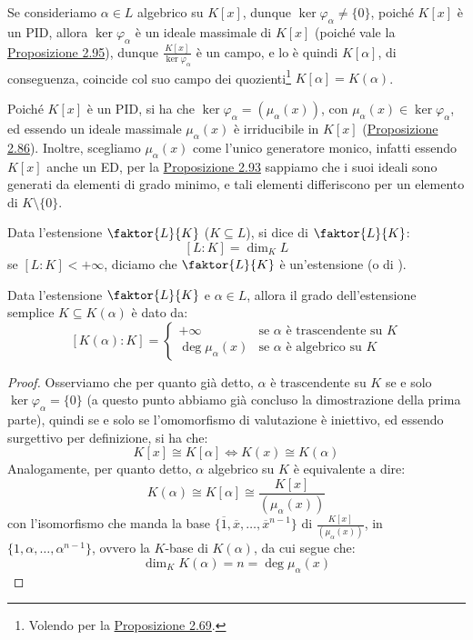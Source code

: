 \documentclass[11pt]{scrartcl}
\begin{document}
Se consideriamo $\alpha \in L$ algebrico su $K[x]$, dunque $\ker \varphi_{\alpha} \ne \{0\}$, poiché $K[x]$ è un PID, allora $\ker \varphi_{\alpha}$ è un ideale massimale di $K[x]$ (poiché 
vale la \hyperref[2.95]{Proposizione 2.95}), dunque $\displaystyle \frac{K[x]}{\ker \varphi_{\alpha}}$ è un campo, e lo è quindi $K[\alpha]$, di conseguenza, coincide col
suo campo dei quozienti\footnote{Volendo per la \hyperref[2.69]{Proposizione 2.69}.} $K[\alpha] = K(\alpha)$.

\begin{remark}
    Poiché $K[x]$ è un PID, si ha che $\ker \varphi_{\alpha} = (\mu_{\alpha}(x))$, con $\mu_\alpha(x) \in \ker \varphi_\alpha$, ed essendo un ideale massimale $\mu_\alpha(x)$ è irriducibile in $K[x]$ (\hyperref[2.86]{Proposizione 2.86}).
    Inoltre, scegliamo $\mu_\alpha(x)$ come l'unico generatore monico, infatti essendo $K[x]$ anche un ED, per la \hyperref[2.93]{Proposizione 2.93} sappiamo che i suoi ideali sono generati da elementi di grado minimo, e tali elementi differiscono per un elemento di $K \setminus\{0\}$.
\end{remark}

\begin{definition}
    Data l'estensione $\faktor{L}{K}$ ($K \subseteq L$), si dice  di $\faktor{L}{K}$:
    \[ [L:K] = \dim_K L
        \]
    se $[L:K] < +\infty$, diciamo che $\faktor{L}{K}$ è un'estensione  (o di ).
\end{definition}

\begin{proposition}
    \label{3.7}
    Data l'estensione $\faktor{L}{K}$ e $\alpha \in L$, allora il grado dell'estensione semplice $K \subseteq K(\alpha)$ è dato da:
    \[ [K(\alpha) : K] = \begin{cases}
        +\infty & \text{se $\alpha$ è trascendente su $K$}\\
        \deg \mu_\alpha(x) & \text{se $\alpha$ è algebrico su $K$}
    \end{cases}
        \]
\end{proposition}

\begin{proof}
    Osserviamo che per quanto già detto, $\alpha$ è trascendente su $K$ se e solo $\ker \varphi_\alpha = \{0\}$ (a questo punto abbiamo già concluso la dimostrazione della prima parte), quindi se e solo se l'omomorfismo di valutazione è iniettivo, ed essendo 
    surgettivo per definizione, si ha che:
    \[ K[x] \cong K[\alpha] \iff K(x) \cong K(\alpha)
        \]
    Analogamente, per quanto detto, $\alpha$ algebrico su $K$ è equivalente a dire:
    \[ K(\alpha) \cong K[\alpha] \cong \frac{K[x]}{(\mu_\alpha(x))}
        \]
    con l'isomorfismo che manda la base $\{\overline 1, \overline x, \ldots, {\overline x}^{n-1}\}$ di $\displaystyle \frac{K[x]}{(\mu_\alpha(x))}$, in $\{1,\alpha,\ldots,\alpha^{n-1}\}$, ovvero la $K$-base di $K(\alpha)$, da cui segue 
    che:
    \[ \dim_K K(\alpha) = n = \deg \mu_\alpha(x)
        \]
\end{proof}
\end{document}
